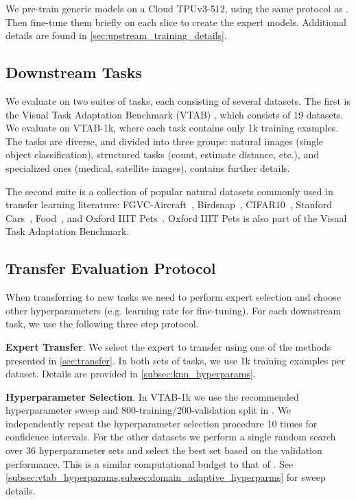 \documentclass{article}
\begin{document}
We pre-train generic models on a Cloud TPUv3-512, using the same protocol as 
\cite{kolesnikov2019large}. Then fine-tune them briefly on each slice to create the expert models.
Additional details are found in \cref{sec:upstream_training_details}.


\subsection{Downstream Tasks}

We evaluate on two suites of tasks, each consisting of several datasets.
The first is the Visual Task Adaptation Benchmark (VTAB) \cite{zhai2019visual}, which consists of 19 datasets.
We evaluate on VTAB-1k, where each task contains only 1k training examples.
The tasks are diverse, and divided into three groups: natural images (single object classification), structured tasks (count, estimate distance, etc.), and specialized ones (medical, satellite images).
 contains further details.

The second suite is a collection of popular natural datasets commonly used in transfer learning literature:
FGVC-Aircraft~\cite{maji13fine-grained}, 
Birdsnap~\cite{berg-birdsnap-cvpr2014},
CIFAR10~\cite{Krizhevsky09learningmultiple}, 
Stanford Cars~\cite{KrauseStarkDengFei-Fei_3DRR2013}, 
Food~\cite{bossard14}, and 
Oxford IIIT Pets~\cite{parkhi12a}.
Oxford IIIT Pets is also part of the Visual Task Adaptation Benchmark.

\subsection{Transfer Evaluation Protocol}
\label{subsec:eval_protocol}
When transferring to new tasks we need to perform expert selection and choose other hyperparameters (e.g. learning rate for fine-tuning).
For each downstream task, we use the following three step protocol.

\textbf{Expert Transfer}. 
We select the expert to transfer using one of the methods presented in \cref{sec:transfer}.
In both sets of tasks, we use 1k training examples per dataset.
Details are provided in \cref{subsec:knn_hyperparams}.

\textbf{Hyperparameter Selection}.
In VTAB-1k we use the recommended hyperparameter sweep and 800-training/200-validation split in \cite{zhai2019visual}. We independently repeat the hyperparameter selection procedure 10 
times for confidence intervals. For the other datasets we perform a single random search over 36 hyperparameter sets and select
the best set based on the validation performance.
This is a similar computational budget to that of \cite{ngiam2018domain}.
See \cref{subsec:vtab_hyperparams,subsec:domain_adaptive_hyperparms} for sweep details.
\end{document}
